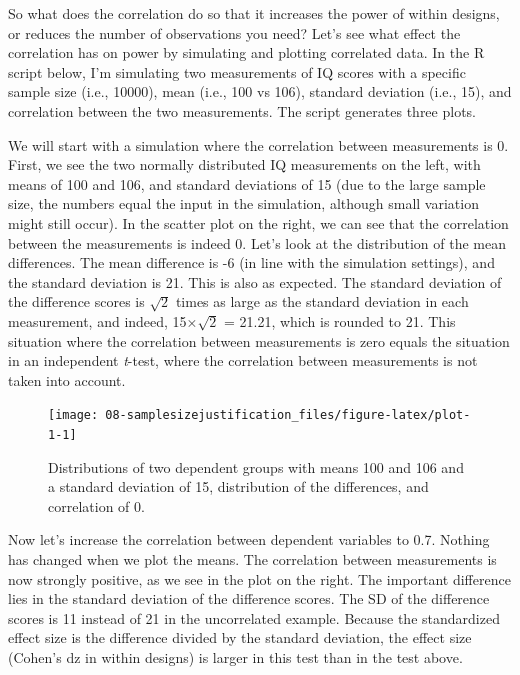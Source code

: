 \documentclass[
]{krantz}
\begin{document}
So what does the correlation do so that it increases the power of within designs, or reduces the number of observations you need? Let's see what effect the correlation has on power by simulating and plotting correlated data. In the R script below, I'm simulating two measurements of IQ scores with a specific sample size (i.e., 10000), mean (i.e., 100 vs 106), standard deviation (i.e., 15), and correlation between the two measurements. The script generates three plots.

We will start with a simulation where the correlation between measurements is 0. First, we see the two normally distributed IQ measurements on the left, with means of 100 and 106, and standard deviations of 15 (due to the large sample size, the numbers equal the input in the simulation, although small variation might still occur). In the scatter plot on the right, we can see that the correlation between the measurements is indeed 0. Let's look at the distribution of the mean differences. The mean difference is -6 (in line with the simulation settings), and the standard deviation is 21. This is also as expected. The standard deviation of the difference scores is \(\sqrt{2}\) times as large as the standard deviation in each measurement, and indeed, 15×\(\sqrt{2}\) = 21.21, which is rounded to 21. This situation where the correlation between measurements is zero equals the situation in an independent \emph{t}-test, where the correlation between measurements is not taken into account.

\begin{figure}

{\centering \texttt{[image: 08-samplesizejustification\_files/figure-latex/plot-1-1]} 

}

\caption{Distributions of two dependent groups with means 100 and 106 and a standard deviation of 15, distribution of the differences, and correlation of 0.}\label{fig:plot-1}
\end{figure}

Now let's increase the correlation between dependent variables to 0.7. Nothing has changed when we plot the means. The correlation between measurements is now strongly positive, as we see in the plot on the right. The important difference lies in the standard deviation of the difference scores. The SD of the difference scores is 11 instead of 21 in the uncorrelated example. Because the standardized effect size is the difference divided by the standard deviation, the effect size (Cohen's dz in within designs) is larger in this test than in the test above.
\end{document}
